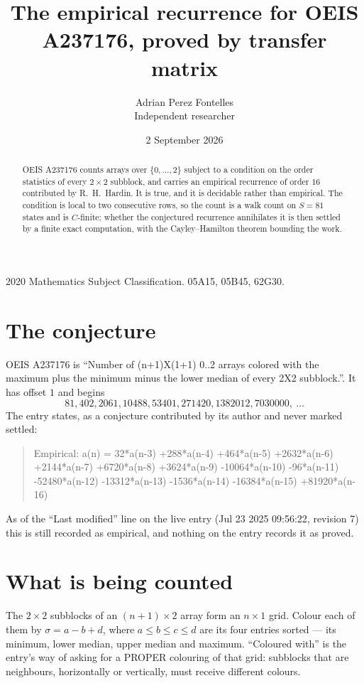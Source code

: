 \documentclass[11pt,a4paper]{article}
\title{The empirical recurrence for OEIS A237176, proved by transfer matrix}
\author{Adrian Perez Fontelles\\ \small Independent researcher}
\date{2 September 2026}
\theoremstyle{plain}
\theoremstyle{definition}
\begin{document}
\maketitle

\begin{abstract}
OEIS A237176 counts arrays over $\{0,\dots,2\}$ subject to a condition on the order
statistics of every $2\times2$ subblock, and carries an empirical recurrence of order
$16$ contributed by R.~H.~Hardin. It is true, and it is decidable rather than empirical.
The condition is local to two consecutive rows, so the count is a walk count on $S=81$
states and is $C$-finite; whether the conjectured recurrence annihilates it is then settled by
a finite exact computation, with the Cayley--Hamilton theorem bounding the work.
\end{abstract}

\noindent\small 2020 Mathematics Subject Classification. 05A15, 05B45, 62G30.\normalsize

\section{The conjecture}

OEIS A237176 is ``Number of (n+1)X(1+1) 0..2 arrays colored with the maximum plus the minimum minus the lower median of every 2X2 subblock.''. It has offset $1$ and begins
\[
81, 402, 2061, 10488, 53401, 271420, 1382012, 7030000,\ \dots
\]
The entry states, as a conjecture contributed by its author and never marked settled:
\begin{quote}
Empirical: a(n) = 32*a(n-3) +288*a(n-4) +464*a(n-5) +2632*a(n-6) +2144*a(n-7) +6720*a(n-8) +3624*a(n-9) -10064*a(n-10) -96*a(n-11) -52480*a(n-12) -13312*a(n-13) -1536*a(n-14) -16384*a(n-15) +81920*a(n-16)
\end{quote}
As of the ``Last modified'' line on the live entry (Jul 23 2025 09:56:22, revision 7) this is still
recorded as empirical, and nothing on the entry records it as proved.

\section{What is being counted}

The $2\times2$ subblocks of an $(n+1)\times2$ array form an
$n\times1$ grid. Colour each of them by $\sigma=a-b+d$, where $a\le b\le c\le d$ are its four entries sorted --- its minimum, lower median, upper median and maximum. ``Coloured with'' is the entry's way of
asking for a PROPER colouring of that grid: subblocks that are neighbours, horizontally or
vertically, must receive different colours.
\end{document}
